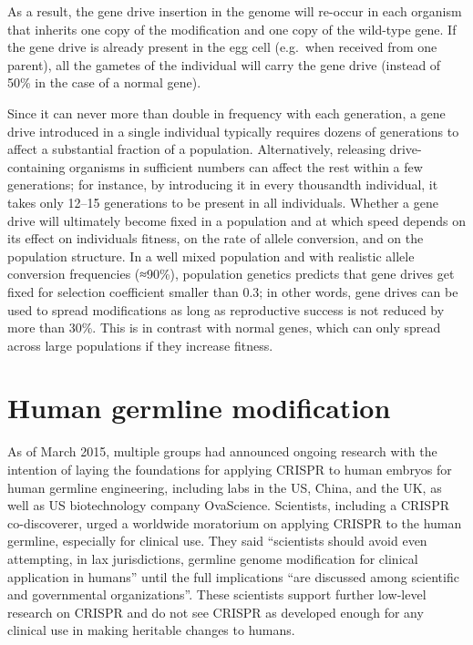 As a result, the gene drive insertion in the genome will re-occur in each organism that inherits one copy of the modification and one copy of the wild-type gene. If the gene drive is already present in the egg cell (e.g.~when received from one parent), all the gametes of the individual will carry the gene drive (instead of 50\% in the case of a normal gene).

Since it can never more than double in frequency with each generation, a gene drive introduced in a single individual typically requires dozens of generations to affect a substantial fraction of a population. Alternatively, releasing drive-containing organisms in sufficient numbers can affect the rest within a few generations; for instance, by introducing it in every thousandth individual, it takes only 12--15 generations to be present in all individuals. Whether a gene drive will ultimately become fixed in a population and at which speed depends on its effect on individuals fitness, on the rate of allele conversion, and on the population structure. In a well mixed population and with realistic allele conversion frequencies (≈90\%), population genetics predicts that gene drives get fixed for selection coefficient smaller than 0.3; in other words, gene drives can be used to spread modifications as long as reproductive success is not reduced by more than 30\%. This is in contrast with normal genes, which can only spread across large populations if they increase fitness.

\hypertarget{human-germline-modification}{%
\section{Human germline modification}\label{human-germline-modification}}

As of March 2015, multiple groups had announced ongoing research with the intention of laying the foundations for applying CRISPR to human embryos for human germline engineering, including labs in the US, China, and the UK, as well as US biotechnology company OvaScience. Scientists, including a CRISPR co-discoverer, urged a worldwide moratorium on applying CRISPR to the human germline, especially for clinical use. They said ``scientists should avoid even attempting, in lax jurisdictions, germline genome modification for clinical application in humans'' until the full implications ``are discussed among scientific and governmental organizations''. These scientists support further low-level research on CRISPR and do not see CRISPR as developed enough for any clinical use in making heritable changes to humans.

